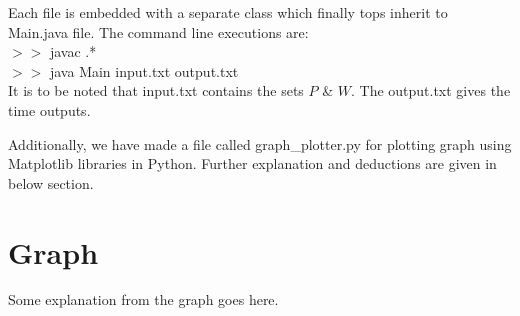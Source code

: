 \documentclass[12pt]{article}
\begin{document}
Each file is embedded with a separate class which finally tops inherit to Main.java file. The command line executions are: \\
$>>$ javac .* \\
$>>$ java Main input.txt output.txt \\ 

It is to be noted that input.txt contains the sets $P$ \& $W$. The output.txt gives the time outputs.

Additionally, we have made a file called graph\_plotter.py for plotting graph using Matplotlib libraries in Python. Further explanation and deductions are given in below section.

\section{Graph}

Some explanation from the graph goes here.
\end{document}
